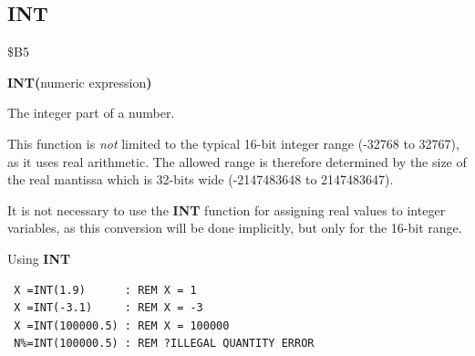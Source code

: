
\newpage
\subsection{INT}
\begin{description}[leftmargin=2cm,style=nextline]
\item [Token:]    \$B5

\item [Format:]   {\bf INT(}numeric expression{\bf)}

\item [Returns:]  The integer part of a number.

                  This function is \emph{not} limited to the typical 16-bit integer range (-32768 to 32767), as it uses real arithmetic. The allowed range is therefore determined by the size of the real mantissa which is 32-bits wide (-2147483648 to 2147483647).

\item [Remarks:]  It is not necessary to use the {\bf INT} function for assigning real values to integer variables, as this conversion will be done implicitly, but only for the 16-bit range.

\item [Examples:] Using {\bf INT}

\begin{tcolorbox}[colback=black,coltext=white]
\verbatimfont{\codefont}
\begin{verbatim}
 X =INT(1.9)      : REM X = 1
 X =INT(-3.1)     : REM X = -3
 X =INT(100000.5) : REM X = 100000
 N%=INT(100000.5) : REM ?ILLEGAL QUANTITY ERROR
\end{verbatim}
\end{tcolorbox}
\end{description}


\newpage
